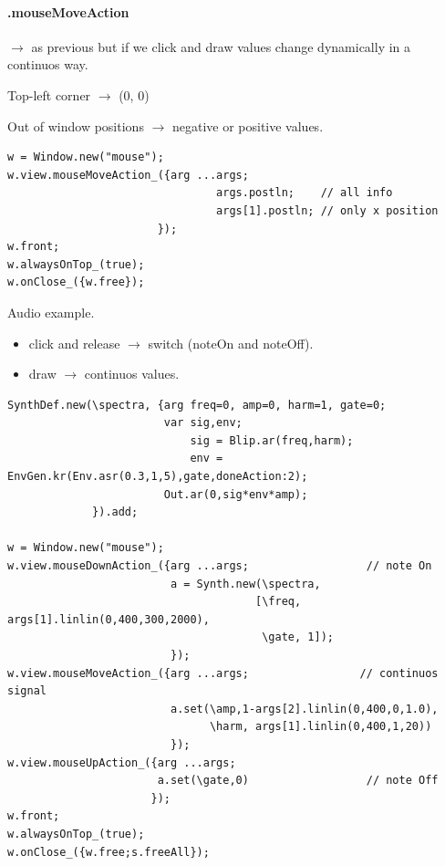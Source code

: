 \paragraph{.mouseMoveAction} \(\rightarrow\) as previous but if we click and draw values change dynamically in a continuos way.

Top-left corner \(\rightarrow\) (0, 0)

Out of window positions \(\rightarrow\) negative or positive values.

\begin{lstlisting}[frame=single, caption=mouseMoveAction model] 
w = Window.new("mouse");
w.view.mouseMoveAction_({arg ...args;
                                args.postln;    // all info
                                args[1].postln; // only x position
                       });
w.front;
w.alwaysOnTop_(true);
w.onClose_({w.free});
\end{lstlisting} 

Audio example.

\begin{itemize}
\tightlist
\item click and release \(\rightarrow\) switch (noteOn and noteOff).
\item draw \(\rightarrow\) continuos values.
\end{itemize}

\begin{lstlisting}[frame=single] 
SynthDef.new(\spectra, {arg freq=0, amp=0, harm=1, gate=0;
                        var sig,env;
                            sig = Blip.ar(freq,harm);
                            env = EnvGen.kr(Env.asr(0.3,1,5),gate,doneAction:2);
                        Out.ar(0,sig*env*amp);
             }).add;

w = Window.new("mouse");
w.view.mouseDownAction_({arg ...args;                  // note On 
                         a = Synth.new(\spectra, 
                                      [\freq, args[1].linlin(0,400,300,2000),
                                       \gate, 1]);
                         });
w.view.mouseMoveAction_({arg ...args;                 // continuos signal
	                     a.set(\amp,1-args[2].linlin(0,400,0,1.0),
		                       \harm, args[1].linlin(0,400,1,20))
                         });
w.view.mouseUpAction_({arg ...args;
                       a.set(\gate,0)                  // note Off
                      });
w.front;
w.alwaysOnTop_(true);
w.onClose_({w.free;s.freeAll});
\end{lstlisting} 

